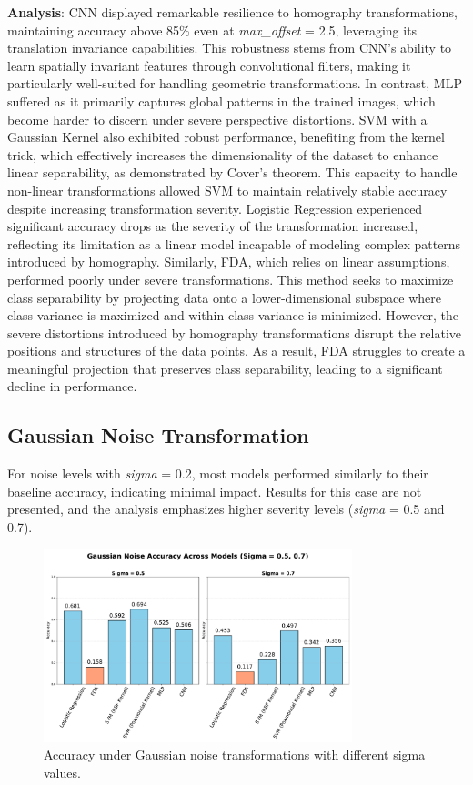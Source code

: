 \documentclass{article}
\begin{document}
\textbf{Analysis}:  
CNN displayed remarkable resilience to homography transformations, maintaining accuracy above 85\% even at \textit{max\_offset} = 2.5, leveraging its translation invariance capabilities. 
This robustness stems from CNN's ability to learn spatially invariant features through convolutional filters, making it particularly well-suited for handling geometric transformations. 
In contrast, MLP suffered as it primarily captures global patterns in the trained images, which become harder to discern under severe perspective distortions. 
SVM with a Gaussian Kernel also exhibited robust performance, benefiting from the kernel trick, which effectively increases the dimensionality of the dataset to enhance linear 
separability, as demonstrated by Cover's theorem. This capacity to handle non-linear transformations allowed SVM to maintain relatively stable accuracy despite increasing transformation severity. 
Logistic Regression experienced significant accuracy drops as the severity of the transformation increased, reflecting its limitation as a linear model incapable of modeling 
complex patterns introduced by homography. Similarly, FDA, which relies on linear assumptions, performed poorly under severe transformations. 
This method seeks to maximize class separability by projecting data onto a lower-dimensional subspace where class variance is maximized and within-class variance is minimized. 
However, the severe distortions introduced by homography transformations disrupt the relative positions and structures of the data points. 
As a result, FDA struggles to create a meaningful projection that preserves class separability, leading to a significant decline in performance.

\subsection{Gaussian Noise Transformation}
For noise levels with \textit{sigma} = 0.2, most models performed similarly to their baseline accuracy, indicating minimal impact. Results for this case are not presented, and the analysis emphasizes higher severity levels (\textit{sigma} = 0.5 and 0.7).

\begin{figure}[h!]
    \centering
    \includegraphics[width=0.8\textwidth]{images/gaussian_noise.pdf}
    \caption{Accuracy under Gaussian noise transformations with different sigma values.}
    \label{fig:gaussian_noise_accuracy}
\end{figure}
\end{document}
